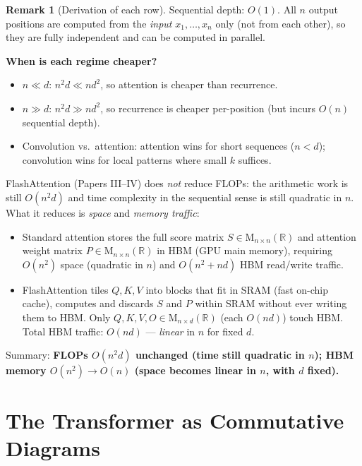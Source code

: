 \documentclass[11pt]{amsart}
\theoremstyle{plain}
\theoremstyle{definition}
\newtheorem{remark}[theorem]{Remark}
\newcommand{\R}{\mathbb{R}}
\newcommand{\Mat}[2]{\mathrm{M}_{#1 \times #2}(\R)}
\begin{document}
\begin{remark}[Derivation of each row]
Sequential depth: $O(1)$.  All $n$ output positions are computed from the
\emph{input} $x_1,\ldots,x_n$ only (not from each other), so they are fully
independent and can be computed in parallel.

\medskip
\textbf{When is each regime cheaper?}
\begin{itemize}
    \item $n \ll d$: $n^2 d \ll n d^2$, so attention is cheaper than recurrence.
    \item $n \gg d$: $n^2 d \gg n d^2$, so recurrence is cheaper per-position
    (but incurs $O(n)$ sequential depth).
    \item Convolution vs.\ attention: attention wins for short sequences
    ($n < d$); convolution wins for local patterns where small $k$ suffices.
\end{itemize}
FlashAttention (Papers III--IV) does \emph{not} reduce FLOPs: the arithmetic
work is still $O(n^2 d)$ and time complexity in the sequential sense is still
quadratic in $n$.  What it reduces is \emph{space} and \emph{memory traffic}:
\begin{itemize}
    \item Standard attention stores the full score matrix $S \in \Mat{n}{n}$
    and attention weight matrix $P \in \Mat{n}{n}$ in HBM (GPU main memory),
    requiring $O(n^2)$ space (quadratic in $n$) and $O(n^2 + nd)$ HBM
    read/write traffic.
    \item FlashAttention tiles $Q,K,V$ into blocks that fit in SRAM (fast
    on-chip cache), computes and discards $S$ and $P$ within SRAM without
    ever writing them to HBM.  Only $Q,K,V,O \in \Mat{n}{d}$ (each $O(nd)$)
    touch HBM.  Total HBM traffic: $O(nd)$ --- \emph{linear} in $n$ for
    fixed $d$.
\end{itemize}
Summary: \textbf{FLOPs $O(n^2 d)$ unchanged (time still quadratic in $n$);
HBM memory $O(n^2) \to O(n)$ (space becomes linear in $n$, with $d$ fixed).}
\end{remark}

\section{The Transformer as Commutative Diagrams}
\label{sec:transformer-diagram}
\end{document}
